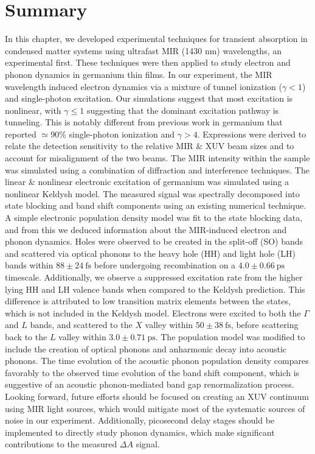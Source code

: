 \section{Summary}


In this chapter, we developed experimental techniques for transient absorption in condensed matter systems using ultrafast MIR (1430 nm) wavelengths, an experimental first. These techniques were then applied to study electron and phonon dynamics in germanium thin films. In our experiment, the MIR wavelength induced electron dynamics via a mixture of tunnel ionization ($\gamma < 1$) and single-photon excitation. Our simulations suggest that most excitation is nonlinear, with $\gamma \le 1$ suggesting that the dominant excitation pathway is tunneling. This is notably different from previous work in germanium that reported $\simeq 90\%$ single-photon ionization and $\gamma > 4$. Expressions were derived to relate the detection sensitivity to the relative MIR \& XUV beam sizes and to account for misalignment of the two beams. The MIR intensity within the sample was simulated using a combination of diffraction and interference techniques. The linear \& nonlinear electronic excitation of germanium was simulated using a nonlinear Keldysh model. The measured signal was spectrally decomposed into state blocking and band shift components using an existing numerical technique. A simple electronic population density model was fit to the state blocking data, and from this we deduced information about the MIR-induced electron and phonon dynamics. Holes were observed to be created in the split-off (SO) bands and scattered via optical phonons to the heavy hole (HH) and light hole (LH) bands within $88 \pm 24 \ \textrm{fs}$ before undergoing recombination on a $4.0 \pm 0.66 \ \textrm{ps}$ timescale. Additionally, we observe a suppressed excitation rate from the higher lying HH and LH valence bands when compared to the Keldysh prediction. This difference is attributed to low transition matrix elements between the states, which is not included in the Keldysh model. Electrons were excited to both the $\Gamma$ and $L$ bands, and scattered to the $X$ valley within $50 \pm 38 \ \textrm{fs}$, before scattering back to the $L$ valley within $3.0 \pm 0.71 \ \textrm{ps}$. The population model was modified to include the creation of optical phonons and anharmonic decay into acoustic phonons. The time evolution of the acoustic phonon population density compares favorably to the observed time evolution of the band shift component, which is suggestive of an acoustic phonon-mediated band gap renormalization process. Looking forward, future efforts should be focused on creating an XUV continuum using MIR light sources, which would mitigate most of the systematic sources of noise in our experiment. Additionally, picosecond delay stages should be implemented to directly study phonon dynamics, which make significant contributions to the measured $\Delta A$ signal.




